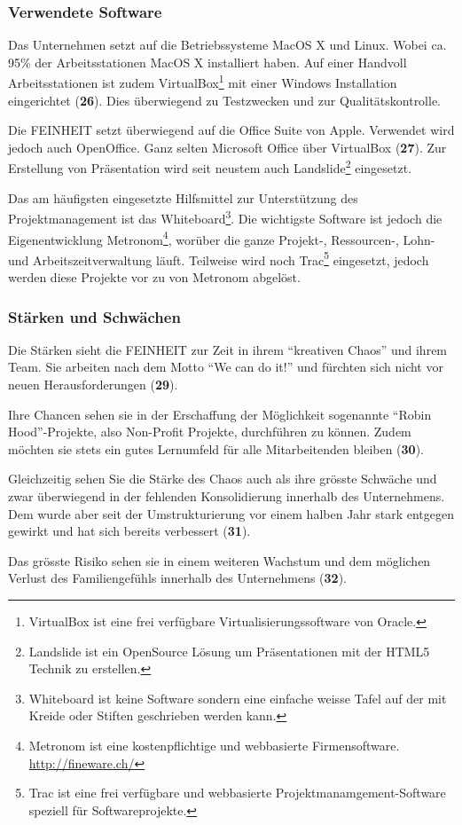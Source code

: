 \subsubsection{Verwendete Software}
Das Unternehmen setzt auf die Betriebssysteme MacOS X und Linux. Wobei ca.
95\% der Arbeitsstationen MacOS X installiert haben. Auf einer Handvoll 
Arbeitsstationen ist zudem VirtualBox\footnote{VirtualBox ist eine frei verfügbare
Virtualisierungssoftware von Oracle.} mit einer Windows Installation eingerichtet (\textbf{26}).
Dies überwiegend zu Testzwecken und zur Qualitätskontrolle.

Die FEINHEIT setzt überwiegend auf die Office Suite von Apple. Verwendet wird
jedoch auch OpenOffice. Ganz selten Microsoft Office über VirtualBox (\textbf{27}).
Zur Erstellung von Präsentation wird seit neustem auch Landslide\footnote{Landslide
ist ein OpenSource Lösung um Präsentationen mit der HTML5 Technik zu erstellen.} 
eingesetzt.

Das am häufigsten eingesetzte Hilfsmittel zur Unterstützung des Projektmanagement
ist das Whiteboard\footnote{Whiteboard ist keine Software sondern eine einfache
weisse Tafel auf der mit Kreide oder Stiften geschrieben werden kann.}. Die 
wichtigste Software ist jedoch die Eigenentwicklung Metronom\footnote{Metronom 
ist eine kostenpflichtige und webbasierte Firmensoftware. \url{http://fineware.ch/}}, worüber die ganze
Projekt-, Ressourcen-, Lohn- und Arbeitszeitverwaltung läuft. Teilweise wird
noch Trac\footnote{Trac ist eine frei verfügbare und webbasierte 
Projektmanamgement-Software speziell für Softwareprojekte.} eingesetzt, jedoch 
werden diese Projekte vor zu von Metronom abgelöst.

\subsubsection{Stärken und Schwächen}
Die Stärken sieht die FEINHEIT zur Zeit in ihrem ``kreativen Chaos'' und ihrem
Team. Sie arbeiten nach dem Motto ``We can do it!'' und fürchten sich nicht 
vor neuen Herausforderungen (\textbf{29}).

Ihre Chancen sehen sie in der Erschaffung der Möglichkeit sogenannte ``Robin Hood''-Projekte,
also Non-Profit Projekte, durchführen zu können. Zudem möchten sie stets ein
gutes Lernumfeld für alle Mitarbeitenden bleiben (\textbf{30}).

Gleichzeitig sehen Sie die Stärke des Chaos auch als ihre grösste Schwäche und 
zwar überwiegend in der fehlenden Konsolidierung innerhalb des Unternehmens. 
Dem wurde aber seit der Umstrukturierung vor einem halben Jahr stark entgegen
gewirkt und hat sich bereits verbessert (\textbf{31}).

Das grösste Risiko sehen sie in einem weiteren Wachstum und dem möglichen 
Verlust des Familiengefühls innerhalb des Unternehmens (\textbf{32}).